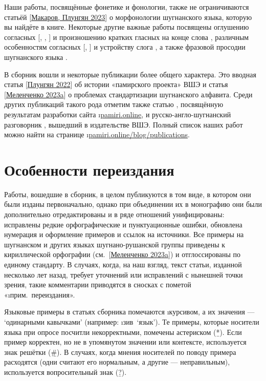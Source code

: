 Наши работы, посвящённые фонетике и фонологии, также не ограничиваются статьёй [\b{\hyperref[chapter-makplun-morphon]{Макаров, Плунгян 2023}}] о морфонологии шугнанского языка, которую вы найдёте в книге. Некоторые другие важные работы посвящены
оглушению согласных [\cite{makarov2022_blowing}, \cite*{makarov2023_aspiration}, \cite*{makarov2024_essential}]
и произношению кратких гласных на конце слова \parencite{makarov2023_lowering},
различным особенностям согласных [\cite{makarov2023_obstruents}, \cite*{makarov2023_uvular}]
и устройству слога \parencite{makarov2023_phonotactics},
а также фразовой просодии шугнанского языка \parencite{sedunova2024}.

В сборник вошли и некоторые публикации более общего характера. Это
вводная статья [\b{\hyperref[chapter-plun-retro]{Плунгян 2022}}] об истории «памирского проекта» ВШЭ
и статья [\b{\hyperref[chapter-melen-ortho]{Меленченко 2023a}}] о проблемах стандартизации шугнанского алфавита. Среди других публикаций такого рода отметим также
статью \parencite{makarov_etal2022}, посвящённую результатам разработки сайта \i{\href{https://pamiri.online}{pamiri.online}},
и русско-англо-шугнанский разговорник \parencite{sergienko2021}, вышедший в издательстве ВШЭ.
Полный список наших работ можно найти на странице \i{\href{https://pamiri.online/blog/publications}{pamiri.online/blog/publications}}.

\section*{Особенности переиздания}

Работы, вошедшие в сборник, в целом публикуются в том виде, в котором они были изданы первоначально, однако при объединении их в монографию они были дополнительно отредактированы и в ряде отношений унифицированы: исправлены редкие орфографические и пунктуационные ошибки, обновлена нумерация и оформление примеров и ссылок на источники. Все примеры на шугнанском и других языках шугнано-рушанской группы приведены к кириллической орфографии (см.~[\hyperref[chapter-melen-ortho]{Меленченко 2023a}]) и отглоссированы по единому стандарту. В случаях, когда, на наш взгляд, текст статьи, изданной несколько лет назад, требует уточнений или исправлений с нынешней точки зрения, такие комментарии приводятся в сносках с пометой «\i{прим.~переиздания}».

Языковые примеры в статьях сборника помечаются \i{курсивом}, а их значения — ‘одинарными кавычками’ (например: \i{зив}~‘язык’). Те примеры, которые носители языка при опросе посчитли некорректными, помечены астериском (\b{*}). Если пример корректен, но не в упомянутом значении или контексте, используется знак решётки (\b{\#}). В случаях, когда мнения носителей по поводу примера расходятся (одни считают его нормальным, а другие — неправильным), используется вопросительный знак (\b{?}).

